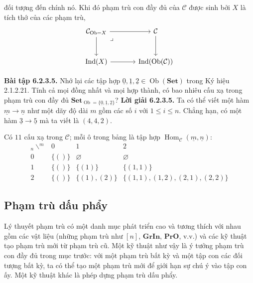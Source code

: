 đối tượng đến chính nó. Khi đó phạm trù con đầy đủ của $\mathcal C$ được sinh bởi $X$ là tích thớ của các phạm trù,
\[\begin{tikzcd}[column sep=large,row sep=large]\mathcal C_{\operatorname{Ob}=X}\arrow[r]\arrow[d]\arrow[dr,phantom,"\lrcorner",very near start]&\mathcal C\arrow[d]\\\operatorname{Ind}(X)\arrow[r]&\operatorname{Ind}(\operatorname{Ob}(\mathcal C))\end{tikzcd}\]

\noindent\textbf{Bài tập 6.2.3.5.} Nhớ lại các tập hợp $\underline0,\underline1,\underline2\in\operatorname{Ob}(\mathbf{Set})$ trong Ký hiệu 2.1.2.21. Tính cả mọi đồng nhất và mọi hợp thành, có bao nhiêu cấu xạ trong phạm trù con đầy đủ $\mathbf{Set}_{\operatorname{Ob}=\{\underline0,\underline1,\underline2\}}$?
\noindent\textbf{Lời giải 6.2.3.5.} Ta có thể viết một hàm $\underline m\to\underline n$ như một dãy độ dài $m$ gồm các số $i$ với $1\leq i\leq n$. Chẳng hạn, có một hàm $\underline3\to\underline5$ mà ta viết là $(4,4,2)$.

Có $11$ cấu xạ trong $\mathcal C$; mỗi ô trong bảng là tập hợp $\operatorname{Hom}_{\mathcal C}(\underline m,\underline n)$:
\[\begin{array}{c|ccc}{}_{n}\!\backslash^{m}&0&1&2\\\hline
0&\{()\}&\varnothing&\varnothing\\
1&\{()\}&\{(1)\}&\{(1,1)\}\\
2&\{()\}&\{(1),(2)\}&\{(1,1),(1,2),(2,1),(2,2)\}
\end{array}\]

\subsection{Phạm trù dấu phẩy}
Lý thuyết phạm trù có một danh mục phát triển cao và tương thích với nhau gồm các vật liệu (những phạm trù như $[n]$, $\mathbf{GrIn}$, $\mathbf{PrO}$, v.v.) và các kỹ thuật tạo phạm trù mới từ phạm trù cũ. Một kỹ thuật như vậy là ý tưởng phạm trù con đầy đủ trong mục trước: với một phạm trù bất kỳ và một tập con các đối tượng bất kỳ, ta có thể tạo một phạm trù mới để giới hạn sự chú ý vào tập con ấy. Một kỹ thuật khác là phép dựng phạm trù dấu phẩy.

